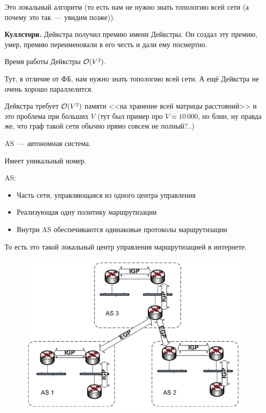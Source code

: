 Это локальный алгоритм (то есть нам не нужно знать топологию всей сети (а почему это так~--- увидим позже)).

{\bf Куллстори.} Дейкстра получил премию имени Дейкстры. Он создал эту премию, умер, премию переименовали в его честь и дали ему посмертно.

Время работы Дейкстры $\mathcal{O}(V^2)$.

Тут, в отличие от ФБ, нам нужно знать топологию всей сети. А ещё Дейкстра не очень хорошо параллелится.

Дейкстра требует $\mathcal{O}(V^2)$ памяти <<на хранение всей матрицы расстояний>> и это проблема при больших $V$ (тут был пример про $V\approx 10\,000$, но блин, ну правда же, что граф такой сети обычно прямо совсем не полный?..) 


AS~--- автономная система.

Имеет уникальный номер.

AS:
\begin{itemize}
    \item Часть сети, управляющаяся из одного центра управления
    \item Реализующая одну политику маршрутизации
    \item Внутри AS обеспечиваются одинаковые протоколы маршрутизации
\end{itemize}

То есть это такой локальный центр управления маршрутизацией в интернете.

\begin{figure}[H]
  \centering
  \includegraphics[width=15cm]{images/04/04}
\end{figure}

